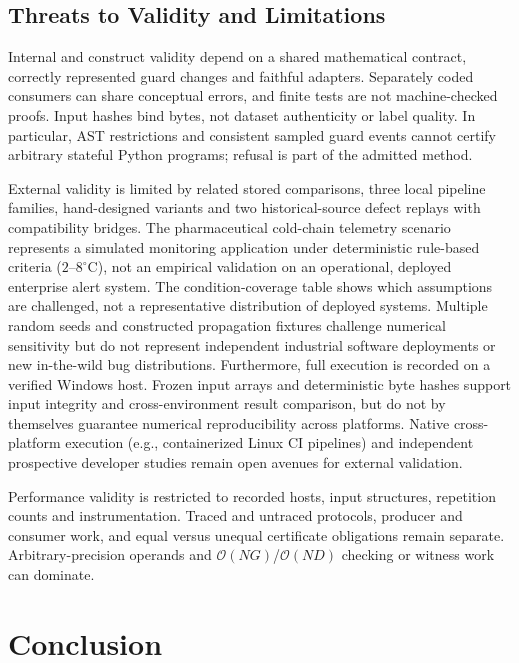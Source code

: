 \documentclass[11pt,a4paper]{article}
\begin{document}
\subsection{Threats to Validity and Limitations}

Internal and construct validity depend on a shared mathematical contract, correctly represented guard changes and faithful adapters. Separately coded consumers can share conceptual errors, and finite tests are not machine-checked proofs. Input hashes bind bytes, not dataset authenticity or label quality. In particular, AST restrictions and consistent sampled guard events cannot certify arbitrary stateful Python programs; refusal is part of the admitted method.

External validity is limited by related stored comparisons, three local pipeline families, hand-designed variants and two historical-source defect replays with compatibility bridges. The pharmaceutical cold-chain telemetry scenario represents a simulated monitoring application under deterministic rule-based criteria ($2\text{--}8^\circ\text{C}$), not an empirical validation on an operational, deployed enterprise alert system. The condition-coverage table shows which assumptions are challenged, not a representative distribution of deployed systems. Multiple random seeds and constructed propagation fixtures challenge numerical sensitivity but do not represent independent industrial software deployments or new in-the-wild bug distributions. Furthermore, full execution is recorded on a verified Windows host. Frozen input arrays and deterministic byte hashes support input integrity and cross-environment result comparison, but do not by themselves guarantee numerical reproducibility across platforms. Native cross-platform execution (e.g., containerized Linux CI pipelines) and independent prospective developer studies remain open avenues for external validation.

Performance validity is restricted to recorded hosts, input structures, repetition counts and instrumentation. Traced and untraced protocols, producer and consumer work, and equal versus unequal certificate obligations remain separate. Arbitrary-precision operands and $\mathcal{O}(NG)$/$\mathcal{O}(ND)$ checking or witness work can dominate.


\section{Conclusion}\label{sec:conclusion}
\end{document}
